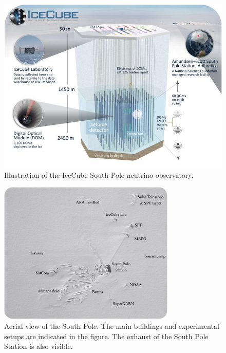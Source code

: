 \begin{figure}
\centering
\includegraphics[width=1.1\textwidth]{chapter5/img/icecube_detector_2.jpg}
\caption{Illustration of the IceCube South Pole neutrino observatory.}
\label{fig:ICgeometry}
\end{figure} 

\begin{figure}
\centering
\includegraphics[width=0.75\textwidth]{chapter5/img/SouthPole_2.jpg}
\caption{Aerial view of the South Pole. The main buildings and experimental setups are indicated in the figure. The exhaust of the South Pole Station is also visible.}
\label{fig:aerialview}
\end{figure} 


